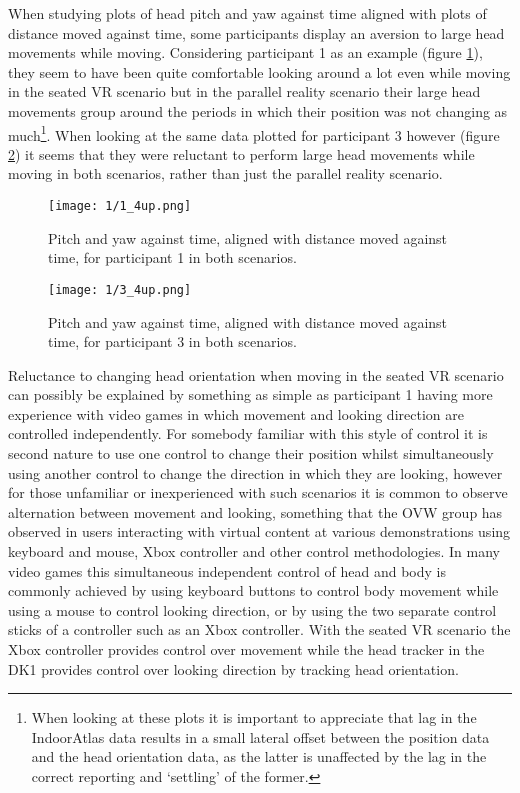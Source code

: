 
When studying plots of head pitch and yaw against time aligned with plots of distance moved against time, some participants display an aversion to large head movements while moving. Considering participant 1 as an example (figure \ref{1_4up.png}), they seem to have been quite comfortable looking around a lot even while moving in the seated VR scenario but in the parallel reality scenario their large head movements group around the periods in which their position was not changing as much\footnote{When looking at these plots it is important to appreciate that lag in the IndoorAtlas data results in a small lateral offset between the position data and the head orientation data, as the latter is unaffected by the lag in the correct reporting and `settling' of the former.}. When looking at the same data plotted for participant 3 however (figure \ref{3_4up.png}) it seems that they were reluctant to perform large head movements while moving in both scenarios, rather than just the parallel reality scenario.

\begin{figure}
	\begin{center}
	\texttt{[image: 1/1\_4up.png]}
	\caption{Pitch and yaw against time, aligned with distance moved against time, for participant 1 in both scenarios.}
	\label{1_4up.png}
	\end{center}
\end{figure}

\begin{figure}
	\begin{center}
	\texttt{[image: 1/3\_4up.png]}
	\caption{Pitch and yaw against time, aligned with distance moved against time, for participant 3 in both scenarios.}
	\label{3_4up.png}
	\end{center}
\end{figure}

Reluctance to changing head orientation when moving in the seated VR scenario can possibly be explained by something as simple as participant 1 having more experience with video games in which movement and looking direction are controlled independently. For somebody familiar with this style of control it is second nature to use one control to change their position whilst simultaneously using another control to change the direction in which they are looking, however for those unfamiliar or inexperienced with such scenarios it is common to observe alternation between movement and looking, something that the OVW group has observed in users interacting with virtual content at various demonstrations using keyboard and mouse, Xbox controller and other control methodologies. In many video games this simultaneous independent control of head and body is commonly achieved by using keyboard buttons to control body movement while using a mouse to control looking direction, or by using the two separate control sticks of a controller such as an Xbox controller. With the seated VR scenario the Xbox controller provides control over movement while the head tracker in the DK1 provides control over looking direction by tracking head orientation.

